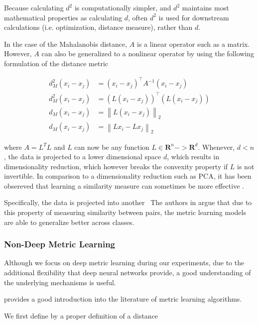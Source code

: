 \documentclass[a4paper,12pt,oneside,openright]{report}
\begin{document}
Because calculating $d^2$ is computationally simpler, and $d^2$ maintains most mathematical properties as calculating $d$, often $d^2$ is used for downstream calculations (i.e. optimization, distance measure), rather than $d$.

In the case of the Mahalanobis distance, $A$ is a linear operator such as a matrix.
However, $A$ can also be generalized to a nonlinear operator by using the following formulation of the distance metric

\begin{align}
d_{M}^{2}\left(x_{i}-x_{j}\right) &=\left(x_{i}-x_{j}\right)^{\top} A^{-1}\left(x_{i}-x_{j}\right) \\
d_{M}^{2}\left(x_{i}-x_{j}\right) &= (L\left(x_{i}-x_{j}\right))^{\top} (L\left(x_{i}-x_{j}\right)) \\
d_{M}\left(x_{i}-x_{j}\right) &=\left\|L\left(x_{i}-x_{j}\right)\right\|_{2} \\
d_{M}\left(x_{i}-x_{j}\right) &=\left\|Lx_{i}-Lx_{j}\right\|_{2}
\end{align}

where $A = L^T L$ and $L$ can now be any function $L \in \mathbf{R}^n -> \mathbf{R}^d$. 
Whenever, $d < n$, the data is projected to a lower dimensional space $d$, which results in dimensionality reduction, which however breaks the convexity property if $L$ is not invertible.
In comparison to a dimensionality reduction such as PCA, it has been obsereved that learning a similarity measure can sometimes be more effective \cite{chechik10}.

Specifically, the data is projected into another  \
The authors in \cite{moutafis17} argue that due to this property of measuring similarity between pairs, the metric learning models are able to generalize better across classes.

\subsubsection{Non-Deep Metric Learning}

Although we focus on deep metric learning during our experiments, due to the additional flexibility that deep neural networks provide, a good understanding of the underlying mechanisms is useful.

\cite{suarez19} provides a good introduction into the literature of metric learning algorithms.

We first define by a proper definition of a distance
\end{document}
